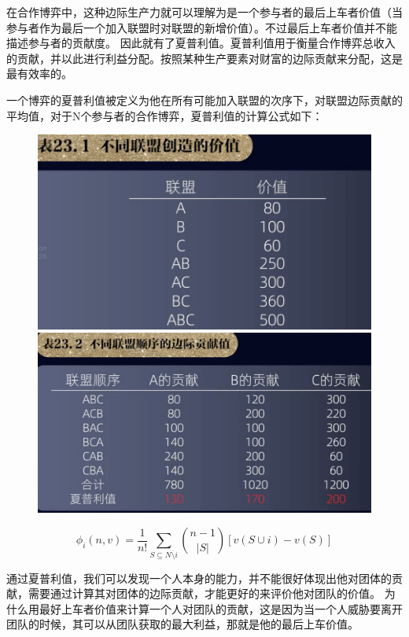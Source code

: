 \documentclass[12pt, a4paper]{article} %
\begin{document}
\begin{CJK*}{UTF8}{gbsn}
        在合作博弈中，这种边际生产力就可以理解为是一个参与者的最后上车者价值（当参与者作为最后一个加入联盟时对联盟的新增价值）。不过最后上车者价值并不能描述参与者的贡献度。
        因此就有了夏普利值。夏普利值用于衡量合作博弈总收入的贡献，并以此进行利益分配。按照某种生产要素对财富的边际贡献来分配，这是最有效率的。 \par

        一个博弈的夏普利值被定义为他在所有可能加入联盟的次序下，对联盟边际贡献的平均值，对于N个参与者的合作博弈，夏普利值的计算公式如下：
        \begin{figure}[htbp]
            \includegraphics[width=1\textwidth]{./figures/catch2023-08-06-09.46.08.png}
            \includegraphics[width=1\textwidth]{./figures/catch2023-08-06-09.52.55.png}
        \end{figure}


        \[\phi_i(n,v) = \frac{1}{n!} \sum_{S \subseteq N \setminus {i}} \binom{n-1}{|S|} [v(S \cup {i}) - v(S)]\]

        通过夏普利值，我们可以发现一个人本身的能力，并不能很好体现出他对团体的贡献，需要通过计算其对团体的边际贡献，才能更好的来评价他对团队的价值。
        为什么用最好上车者价值来计算一个人对团队的贡献，这是因为当一个人威胁要离开团队的时候，其可以从团队获取的最大利益，那就是他的最后上车价值。\par


\end{CJK*}
\end{document}

